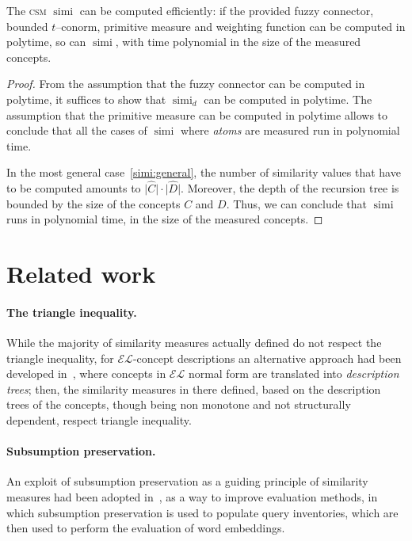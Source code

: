 \documentclass[]{llncs}
\DeclareMathOperator{\simi}{simi}
\newcommand{\el}{\(\mathcal{EL}{}\)}
\newcommand{\csm}{\textsc{csm}}
\begin{document}
  \begin{proposition}
    The \csm{} \(\simi\) can be computed efficiently: if the provided fuzzy connector, bounded \(t\)--conorm, primitive measure and weighting function can be computed in polytime, so can \(\simi\), with time polynomial in the size of the measured concepts.
  \end{proposition}
  \begin{proof}
    From the assumption that the fuzzy connector can be computed in polytime, it suffices to show that \(\simi_d\) can be computed in polytime.
    The assumption that the primitive measure can be computed in polytime allows to conclude that all the cases of \(\simi\) where \emph{atoms} are measured run in polynomial time.

    In the most general case~\eqref{simi:general}, the number of similarity values that have to be computed amounts to \(\lvert \widehat{C} \rvert \cdot \lvert \widehat{D} \rvert\).
    Moreover, the depth of the recursion tree is bounded by the size of the concepts \(C\) and \(D\).
    Thus, we can conclude that \(\simi\) runs in polynomial time, in the size of the measured concepts.
  \end{proof}

  \section{Related work}

  \paragraph{The triangle inequality.} While the majority of similarity measures actually defined do not respect the triangle inequality, for \el-concept descriptions an alternative approach had been developed in~\cite{DAB14}, where concepts in \el{} normal form are translated into \emph{description trees}; then, the similarity measures in there defined, based on the description trees of the concepts, though being non monotone and not structurally dependent, respect triangle inequality.

  \paragraph{Subsumption preservation.} An exploit of subsumption preservation as a guiding principle of similarity measures had been adopted in~\cite{Se16},
  as a way to improve evaluation methods, in which subsumption preservation is used to populate query inventories, which are then used to perform the evaluation of word embeddings.
\end{document}
